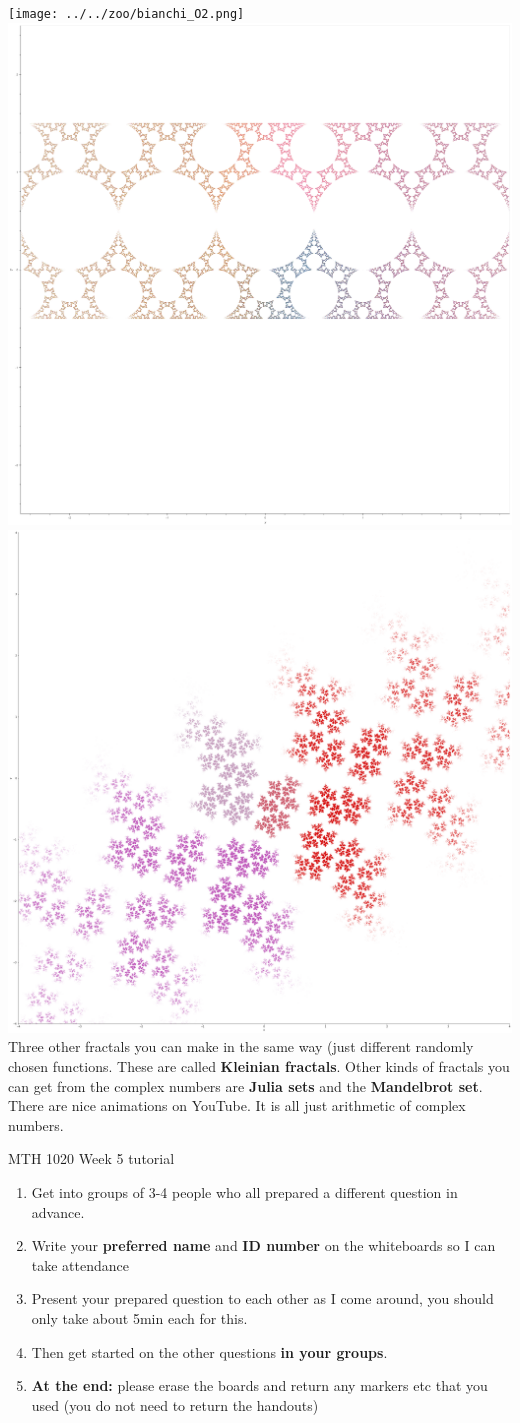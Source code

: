\documentclass[aspectratio=169]{beamer}
\begin{document}
\begin{frame}
\texttt{[image: ../../zoo/bianchi\_O2.png]}%
\includegraphics[width=.33\textwidth]{../../zoo/modular_group_1.png}%
\includegraphics[width=.33\textwidth]{../../zoo/jorgensen_marden1.png}\\
Three other fractals you can make in the same way (just different randomly chosen functions. These are called \textbf{Kleinian fractals}. Other kinds of fractals
you can get from the complex numbers are \textbf{Julia sets} and the \textbf{Mandelbrot set}. There are nice animations on YouTube. It is all just arithmetic of complex numbers.
\end{frame}

\begin{frame}{MTH 1020 Week 5 tutorial}
\begin{enumerate}
  \item Get into groups of 3-4 people who all prepared a different question in advance.
  \item Write your \textbf{preferred name} and \textbf{ID number} on the whiteboards so I can take attendance
  \item Present your prepared question to each other as I come around, you should only take about 5min each for this.
  \item Then get started on the other questions \textbf{in your groups}.
  \item \textbf{At the end:} please erase the boards and return any markers etc that you used (you do not need to return the handouts)
\end{enumerate}
\end{frame}
\end{document}

